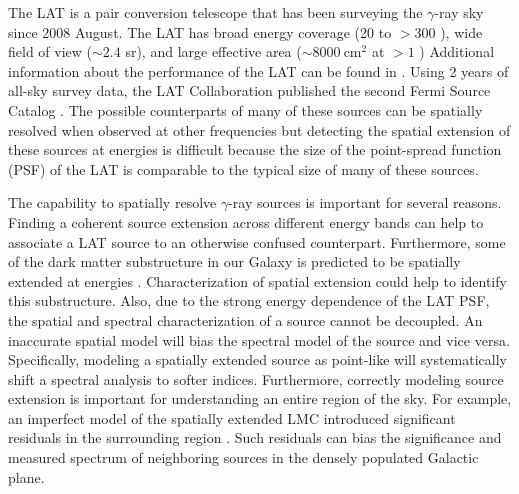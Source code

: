 \documentclass[12pt,preprint]{aastex}
\newcommand{\mev}{\text{MeV}\xspace}
\newcommand{\gev}{\text{GeV}\xspace}
\newcommand{\cm}{\text{cm}\xspace}
\begin{document}
The LAT is a pair conversion telescope that has been surveying the
$\gamma$-ray sky since 2008 August.  The LAT has broad energy coverage
(20 \mev to $>300$ \gev), wide field of view ($\sim 2.4$ sr), and large
effective area ($\sim 8000\ \cm^2$ at $>1$ \gev) 
Additional information about the performance of the LAT can be found in
\cite{atwood_LAT_mission}.
Using 2 years of all-sky survey data, the LAT Collaboration published
the second Fermi Source Catalog \citep[2FGL][]{second_cat}.
The possible counterparts of many of these sources can be spatially resolved
when observed at other frequencies but detecting the spatial extension
of these sources at \gev energies is difficult because the size of the
point-spread function (PSF) of the LAT is comparable to the typical size
of many of these sources.

The capability to spatially resolve \gev $\gamma$-ray
sources is important for several reasons.  
Finding a coherent source extension across different energy bands can
help to associate a LAT source to an otherwise confused counterpart.
Furthermore, some of the dark matter substructure in our Galaxy 
is predicted to be spatially extended at \gev energies \citep{pre_luanch_dark_matter_fermi}.  
Characterization of spatial extension could help to identify this substructure.
Also,
due to the strong energy dependence of the LAT PSF, the spatial and
spectral characterization of a source cannot be
decoupled. An inaccurate
spatial model will bias the spectral model of the source and vice versa. Specifically,
modeling a spatially extended source as point-like will systematically
shift a spectral analysis to softer indices. Furthermore, correctly
modeling source extension is important for 
understanding an entire region of the sky. For example,
an imperfect model of the spatially extended LMC introduced
significant residuals in the surrounding region \citep{first_cat,second_cat}.
Such residuals can bias the significance and measured spectrum of
neighboring sources in the densely populated Galactic plane.
\end{document}
